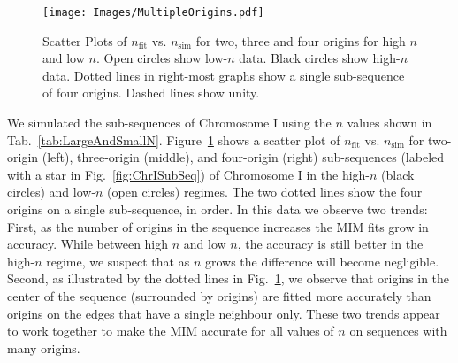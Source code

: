 	\begin{figure}[tbh]
		\begin{center}
			\texttt{[image: Images/MultipleOrigins.pdf]}
		\end{center}
			\caption[Scatter Plots of $n_\text{fit}$ vs. $n_\text{sim}$ for Two, Three and Four Origins]{\label{fig:IncreasingOrigins} 
				Scatter Plots of $n_\text{fit}$ vs. $n_\text{sim}$ for two, three and four origins for high $n$ and low $n$.
				Open circles show low-$n$ data.
				Black circles show high-$n$ data.
				Dotted lines in right-most graphs show a single sub-sequence of four origins.
				Dashed lines show unity.
			}
	\end{figure} 
		
		We simulated the sub-sequences of Chromosome I using the $n$ values shown in Tab.~\ref{tab:LargeAndSmallN}.
		Figure~\ref{fig:IncreasingOrigins} shows a scatter plot of $n_\text{fit}$ vs. $n_\text{sim}$ for two-origin (left), three-origin (middle), and four-origin (right) sub-sequences (labeled with a star in Fig.~\ref{fig:ChrISubSeq}) of Chromosome I in the high-$n$ (black circles) and low-$n$ (open circles) regimes.
		The two dotted lines show the four origins on a single sub-sequence, in order.
		In this data we observe two trends:
		First, as the number of origins in the sequence increases the MIM fits grow in accuracy.
		While between high $n$ and low $n$, the accuracy is still better in the high-$n$ regime, we suspect that as $n$ grows the difference will become negligible.
		Second, as illustrated by the dotted lines in Fig.~\ref{fig:IncreasingOrigins}, we observe that origins in the center of the sequence (surrounded by origins) are fitted more accurately than origins on the edges that have a single neighbour only.
		These two trends appear to work together to make the MIM accurate for all values of $n$ on sequences with many origins.
		





































